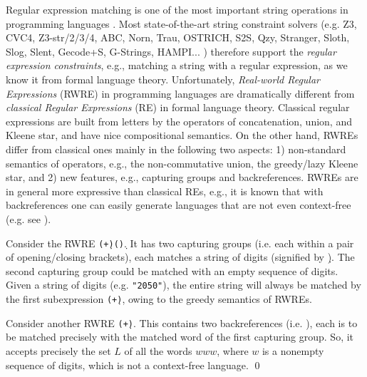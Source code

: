 Regular expression matching is one of the most important string operations
in programming languages \cite{Berkeley-JavaScript,BM17,LMK19,HAMPI}.
Most state-of-the-art string constraint solvers (e.g.
Z3, CVC4, Z3-str/2/3/4, ABC, Norn, Trau, OSTRICH, S2S, Qzy, Stranger, Sloth, Slog, Slent, Gecode+S, G-Strings, HAMPI... ) therefore support
the \emph{regular expression constraints}, e.g., matching a string with a 
regular expression, as we know it from formal language theory. Unfortunately, 
\emph{Real-world Regular Expressions} (RWRE) in programming languages are dramatically different from 
\emph{classical Regular Expressions} (RE) in formal language theory. 
Classical regular expressions are built from letters by the operators of
concatenation, union, and Kleene star, and have nice compositional semantics. On
the other hand, RWREs differ from classical ones mainly in the following two 
aspects: 1) non-standard semantics of 
operators, e.g., the non-commutative union, the greedy/lazy Kleene star, and 2) new 
features, e.g., capturing groups and backreferences.
RWREs are in general more expressive than classical REs, e.g., it is known that
with backreferences one can easily generate languages that are not even 
context-free (e.g. see \cite{FS19,Aho90,BM17b}). %
\begin{example}
    Consider the RWRE \texttt{(\d+)(\d*)}. It has two capturing
    groups (i.e. each within a pair of opening/closing brackets), each matches
    a string of digits (signified by \texttt{\d}). The second 
    capturing group
    could be matched with an empty sequence of digits. Given a string of digits
    (e.g. \texttt{"2050"}), the entire string will always be matched by the
    first subexpression \texttt{(\d+)}, owing to the greedy semantics of
    RWREs. 

    Consider another RWRE \texttt{(\d+)\1\1}. This contains two
    backreferences (i.e. \texttt{\1}), each is to be 
    matched precisely with
    the matched word of the first capturing group. So, it
    accepts precisely the set $L$ of all the words $www$, where $w$ is a 
    nonempty sequence of digits, which is not a context-free language.
    \qed
\end{example}


